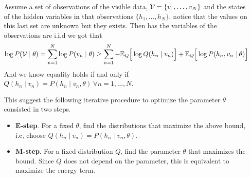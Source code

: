 Assume a set of observations of the visible data, \(\mathcal{V} = \{v_{1}, \dots, v_{N}\}\) and the states of the hidden variables in that observations \(\{h_{1},\dots, h_{N}\}\), notice that the values on this last set are unknown but they exists. Then has the variables of the observations are i.i.d we got that
\[
    \log{P(\mathcal{V}\mid \theta)} = \sum_{n=1}^{N}\log{P(v_{n} \mid \theta)} \geq \sum_{n = 1}^{N} -\mathbb{E}_{Q}\Big[\log{Q(h_{n} \mid v_{n})}\Big] + \mathbb{E}_{Q}\Big[\log{P(h_{n},v_{n} \mid \theta)}\Big]
\]
And we know equality holds if and only if \(Q(h_{n} \mid v_{n}) = P(h_{n} \mid v_{n} , \theta) \ \forall n=1, \dots, N\).

This suggest the following iterative procedure to optimize the parameter \(\theta\) consisted in two steps.
\begin{itemize}
  \item \textbf{E-step}. For a fixed \(\theta\), find the distributions that maximize the above bound, i.e, choose \(Q(h_{n} \mid v_{n}) = P(h_{n} \mid v_{n} , \theta)\).
  \item \textbf{M-step}. For a fixed distribution \(Q\), find the parameter \(\theta\) that maximizes the bound. Since \(Q\) does not depend on the parameter, this is equivalent to maximize the energy term.
\end{itemize}

